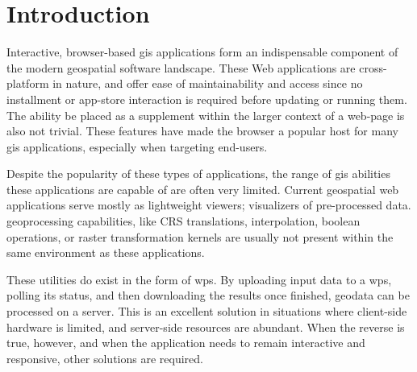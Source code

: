 

\newpage
\section{Introduction}



Interactive, browser-based \ac{gis} applications form an indispensable component of the modern geospatial software landscape. These Web applications are cross-platform in nature, and offer ease of maintainability and access since no installment or app-store interaction is required before updating or running them. The ability be placed as a supplement within the larger context of a web-page is also not trivial. These features have made the browser a popular host for many \ac{gis} applications, especially when targeting end-users. 

Despite the popularity of these types of applications, the range of \ac{gis} abilities these applications are capable of are often very limited. Current geospatial web applications serve mostly as lightweight viewers; visualizers of pre-processed data. \ac{geoprocessing} capabilities, like CRS translations, interpolation, boolean operations, or raster transformation kernels are usually not present within the same environment as these applications. 

These utilities do exist in the form of \ac{wps}. By uploading input data to a \ac{wps}, polling its status, and then downloading the results once finished, geodata can be processed on a server. This is an excellent solution in situations where client-side hardware is limited, and server-side resources are abundant. When the reverse is true, however, and when the application needs to remain interactive and responsive, other solutions are required.

